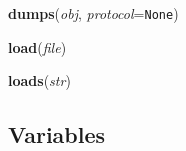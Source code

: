     \label{pickle:dumps}

    \vspace{0.5ex}

\hspace{.8\funcindent}\begin{boxedminipage}{\funcwidth}

    \raggedright \textbf{dumps}(\textit{obj}, \textit{protocol}={\tt None})

\setlength{\parskip}{2ex}
\setlength{\parskip}{1ex}
    \end{boxedminipage}

    \label{pickle:load}

    \vspace{0.5ex}

\hspace{.8\funcindent}\begin{boxedminipage}{\funcwidth}

    \raggedright \textbf{load}(\textit{file})

\setlength{\parskip}{2ex}
\setlength{\parskip}{1ex}
    \end{boxedminipage}

    \label{pickle:loads}

    \vspace{0.5ex}

\hspace{.8\funcindent}\begin{boxedminipage}{\funcwidth}

    \raggedright \textbf{loads}(\textit{str})

\setlength{\parskip}{2ex}
\setlength{\parskip}{1ex}
    \end{boxedminipage}



  \subsection{Variables}

